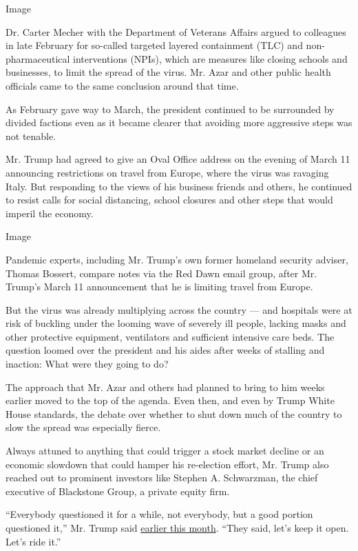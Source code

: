 Image

Dr. Carter Mecher with the Department of Veterans Affairs argued to
colleagues in late February for so-called targeted layered containment
(TLC) and non-pharmaceutical interventions (NPIs), which are measures
like closing schools and businesses, to limit the spread of the virus.
Mr. Azar and other public health officials came to the same conclusion
around that time.

As February gave way to March, the president continued to be surrounded
by divided factions even as it became clearer that avoiding more
aggressive steps was not tenable.

Mr. Trump had agreed to give an Oval Office address on the evening of
March 11 announcing restrictions on travel from Europe, where the virus
was ravaging Italy. But responding to the views of his business friends
and others, he continued to resist calls for social distancing, school
closures and other steps that would imperil the economy.

Image

Pandemic experts, including Mr. Trump's own former homeland security
adviser, Thomas Bossert, compare notes via the Red Dawn email group,
after Mr. Trump's March 11 announcement that he is limiting travel from
Europe.

But the virus was already multiplying across the country --- and
hospitals were at risk of buckling under the looming wave of severely
ill people, lacking masks and other protective equipment, ventilators
and sufficient intensive care beds. The question loomed over the
president and his aides after weeks of stalling and inaction: What were
they going to do?

The approach that Mr. Azar and others had planned to bring to him weeks
earlier moved to the top of the agenda. Even then, and even by Trump
White House standards, the debate over whether to shut down much of the
country to slow the spread was especially fierce.

Always attuned to anything that could trigger a stock market decline or
an economic slowdown that could hamper his re-election effort, Mr. Trump
also reached out to prominent investors like Stephen A. Schwarzman, the
chief executive of Blackstone Group, a private equity firm.

``Everybody questioned it for a while, not everybody, but a good portion
questioned it,'' Mr. Trump said
\href{https://www.whitehouse.gov/briefings-statements/remarks-president-trump-vice-president-pence-members-coronavirus-task-force-press-briefing-17/}{earlier
this month}. ``They said, let's keep it open. Let's ride it.''

